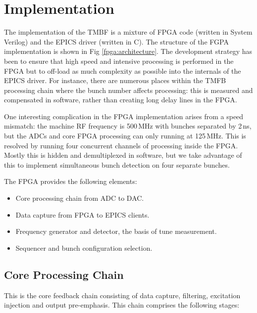 \documentclass{JAC2003}
\begin{document}
\section{Implementation}

The implementation of the TMBF is a mixture of FPGA code (written in System
Verilog) and the EPICS driver (written in C).  The structure of the FGPA
implementation is shown in Fig \ref{fpga:architecture}.  The development
strategy has been to ensure that high speed and intensive processing is
performed in the FPGA but to off-load as much complexity as possible into the
internals of the EPICS driver.  For instance, there are numerous places within
the TMFB processing chain where the bunch number affects processing: this is
measured and compensated in software, rather than creating long delay lines in
the FPGA.

One interesting complication in the FPGA implementation arises from a speed
mismatch: the machine RF frequency is 500\,MHz with bunches separated by 2\,ns,
but the ADCs and core FPGA processing can only running at 125\,MHz.  This is
resolved by running four concurrent channels of processing inside the FPGA.
Mostly this is hidden and demultiplexed in software, but we take advantage of
this to implement simultaneous bunch detection on four separate bunches.

The FPGA provides the following elements:
\begin{itemize}
\item Core processing chain from ADC to DAC.
\item Data capture from FPGA to EPICS clients.
\item Frequency generator and detector, the basis of tune measurement.
\item Sequencer and bunch configuration selection.
\end{itemize}

\subsection{Core Processing Chain}

This is the core feedback chain consisting of data capture, filtering,
excitation injection and output pre-emphasis.  This chain comprises the
following stages:
\end{document}
